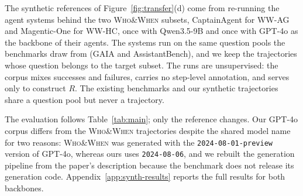 
The synthetic references of Figure~\ref{fig:transfer}(d) come from re-running the agent systems behind the two \textsc{Who\&When} subsets, CaptainAgent for \textsc{WW-AG} and Magentic-One for \textsc{WW-HC}, once with Qwen3.5-9B and once with GPT-4o as the backbone of their agents. The systems run on the same question pools the benchmarks draw from (GAIA and AssistantBench), and we keep the trajectories whose question belongs to the target subset. The runs are unsupervised: the corpus mixes successes and failures, carries no step-level annotation, and serves only to construct $R$. The existing benchmarks and our synthetic trajectories share a question pool but never a trajectory.

The evaluation follows Table~\ref{tab:main}; only the reference changes. Our GPT-4o corpus differs from the \textsc{Who\&When} trajectories despite the shared model name for two reasons: \textsc{Who\&When} was generated with the \texttt{2024-08-01-preview} version of GPT-4o, whereas ours uses \texttt{2024-08-06}, and we rebuilt the generation pipeline from the paper's description because the benchmark does not release its generation code. Appendix~\ref{app:synth-results} reports the full results for both backbones.

